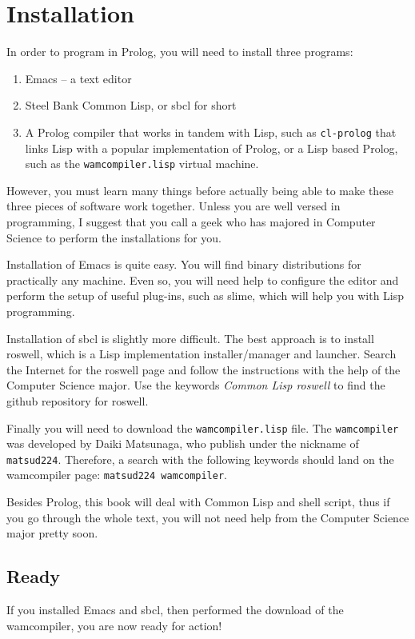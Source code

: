 \documentclass[a4paper,12pt]{book}
\begin{document}
\chapter{Installation}  
In order to program in Prolog, you will need
to install three programs:
\begin{enumerate}
\item Emacs -- a text editor
\item Steel Bank Common Lisp, or sbcl for
 short
\item A Prolog compiler that works in tandem with Lisp,
  such as \verb|cl-prolog| that links Lisp with a
  popular implementation of Prolog, or
  a Lisp based Prolog, such as  the \verb|wamcompiler.lisp|
  virtual machine.
\end{enumerate}

However, you must learn many things before actually being
able to make these three pieces of software work together. 
Unless you are well versed in programming, I suggest that
you call a geek who has majored in Computer Science to perform
the installations for you.

Installation of Emacs is quite easy. You will find binary
distributions for practically any machine. Even so, you
will need help to configure the editor and perform the
setup of useful plug-ins, such as slime, which will help
you with Lisp programming.

Installation of sbcl is slightly more difficult. The
best approach is to install roswell, which is a Lisp
implementation installer/manager and launcher. Search
the Internet for the roswell page  and follow the
instructions with the help of the Computer Science major.
Use the keywords {\em Common Lisp roswell} to find 
the github repository for roswell.

Finally you will need to download the \verb|wamcompiler.lisp|
file. The \verb|wamcompiler| was developed by Daiki Matsunaga,
who publish under the nickname of \verb|matsud224|. Therefore,
a search with the following keywords should land on the
wamcompiler page: \verb|matsud224 wamcompiler|.

Besides Prolog, this book will deal with Common
Lisp and shell script, thus if you go through the whole
text, you will not need help from the Computer Science
major pretty soon.

\section{Ready}
If you installed Emacs and sbcl, then performed the download
of the wamcompiler, you are now ready for action!
\end{document}
